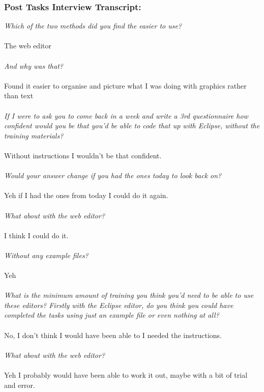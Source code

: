 \documentclass{report}
\begin{document}
\subsubsection*{Post Tasks Interview Transcript:}
\textit{Which of the two methods did you find the easier to use?}
\\
\\
The web editor
\\
\\
\textit{And why was that?}
\\
\\
Found it easier to organise and picture what I was doing with graphics rather than text
\\
\\
\textit{If I were to ask you to come back in a week and write a 3rd questionnaire how confident would you be that you'd be able to code that up with Eclipse, without the training materials?}
\\
\\
Without instructions I wouldn't be that confident.
\\
\\
\textit{Would your answer change if you had the ones today to look back on?}
\\
\\
Yeh if I had the ones from today I could do it again.\\
\\
\textit{What about with the web editor?}
\\
\\
I think I could do it.
\\
\\
\textit{Without any example files?}
\\
\\
Yeh
\\
\\
\textit{What is the minimum amount of training you think you'd need to be able to use these editors? Firstly with the Eclipse editor, do you think you could have completed the tasks using just an example file or even nothing at all?}
\\
\\
No, I don't think I would have been able to I needed the instructions.
\\
\\
\textit{What about with the web editor?}
\\
\\
Yeh I probably would have been able to work it out, maybe with a bit of trial and error.
\end{document}
